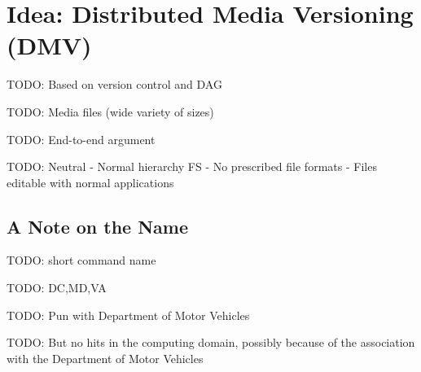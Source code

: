 \chapter{Idea: Distributed Media Versioning (DMV)}

TODO: Based on version control and DAG

TODO: Media files (wide variety of sizes)

TODO: End-to-end argument

TODO: Neutral
    - Normal hierarchy FS
    - No prescribed file formats
    - Files editable with normal applications


\section{A Note on the Name}

TODO: short command name

TODO: DC,MD,VA

TODO: Pun with Department of Motor Vehicles

TODO: But no hits in the computing domain, possibly because of the association
with the Department of Motor Vehicles
